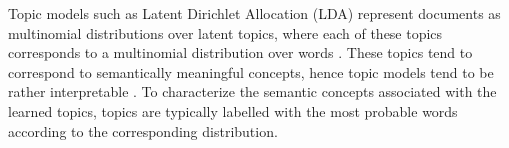 Topic models such as Latent Dirichlet Allocation (LDA) represent documents as multinomial distributions over latent topics, where each of these topics corresponds to a multinomial distribution over words \cite{Blei2003}. These topics tend to correspond to semantically meaningful concepts, hence topic models tend to be rather interpretable \cite{Chang2009}. To characterize the semantic concepts associated with the learned topics, topics are typically labelled with the most probable words according to the corresponding distribution. 

